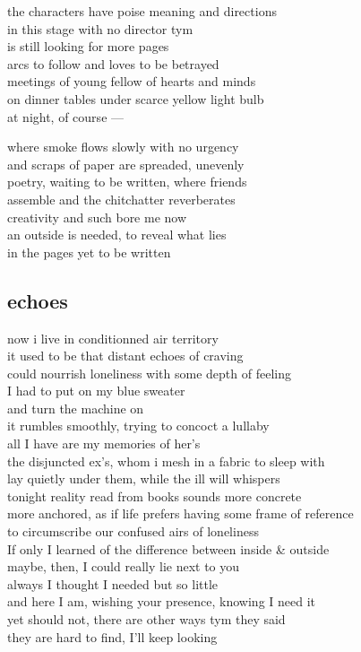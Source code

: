 \documentclass{article}
\begin{document}
the characters have poise meaning and directions\\
in this stage with no director tym\\
is still looking for more pages\\
arcs to follow and loves to be betrayed\\
meetings of young fellow of hearts and minds\\
on dinner tables under scarce yellow light bulb\\
at night, of course ---

where smoke flows slowly with no urgency\\
and scraps of paper are spreaded, unevenly\\
poetry, waiting to be written, where friends\\
assemble and the chitchatter reverberates\\
creativity and such bore me now\\
an outside is needed, to reveal what lies\\
in the pages yet to be written\\

\clearpage

\subsection{echoes}

now i live in conditionned air territory\\
it used to be that distant echoes of craving\\
could nourrish loneliness with some depth of feeling\\
I had to put on my blue sweater \\
and turn the machine on\\

it rumbles smoothly, trying to concoct a lullaby\\
all I have are my memories of her's\\
the disjuncted ex's, whom i mesh in a fabric to sleep with\\
lay quietly under them, while the ill will whispers\\
tonight reality read from books sounds more concrete\\
more anchored, as if life prefers having some frame of reference\\
to circumscribe our confused airs of loneliness\\

If only I learned of the difference between inside \& outside\\
maybe, then, I could really lie next to you\\
always I thought I needed but so little\\
and here I am, wishing your presence, knowing I need it\\
yet should not, there are other ways tym they said\\
they are hard to find, I'll keep looking\\
\clearpage
\end{document}
